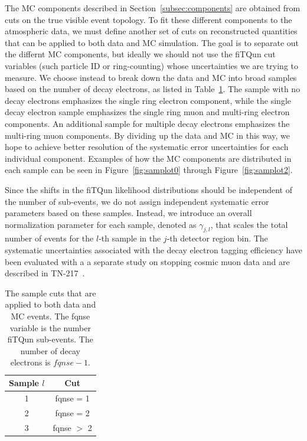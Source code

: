 {The MC components described in Section~\ref{subsec:components} are obtained from
cuts on the true visible event topology.  To fit these different components to
the atmospheric data, we must define another set of cuts on reconstructed quantities
that can be applied to both data and MC simulation.  The goal is to 
separate out the differnt MC components, but ideally we should not
use the fiTQun cut variables (such particle ID or ring-counting) whose
uncertainties we are trying to measure.  We choose instead to break down the
data and MC into broad samples based on the number of decay electrons, as listed
in Table~\ref{tab:samples}.  The sample with no decay electrons emphasizes the
single ring electron component, while the single decay electron sample
emphasizes the single ring muon and multi-ring electron components. An
additional sample for multiple decay electrons emphasizes the multi-ring muon
components.  By dividing up the data and MC in this way, we hope to achieve better
resolution of the systematic error uncertainties for each individual component.
Examples of how the MC components are distributed in each sample can be seen in
Figure~\ref{fig:samplot0} through Figure~\ref{fig:samplot2}.

Since the shifts in the fiTQun likelihood distributions should be independent of the
number of sub-events, we do not assign independent systematic error parameters
based on these samples. Instead, we introduce an overall normalization
parameter for each sample, denoted as $\gamma_{j,l}$, that scales the total
number of events for the $l$-th sample in the $j$-th detector region bin.  The systematic 
uncertainties associated with the decay electron tagging efficiency have been
evaluated with a a separate study on stopping cosmic muon data and are
described in TN-217~\cite{tn317}.

\begin{table}
  \centering
  \begin{tabular}{c | c}
    \hline\hline
    Sample $l$ & Cut \\
    \hline
    1 & fqnse = 1 \\
    2 & fqnse = 2 \\
    3 & fqnse $>$ 2 \\
    \hline\hline
  \end{tabular}
  \caption{The sample cuts that are applied to both data and MC events. The
  fqnse variable is the number fiTQun sub-events. The number of decay electrons
  is $fqnse -1$. }
  \label{tab:samples}
\end{table}


}
